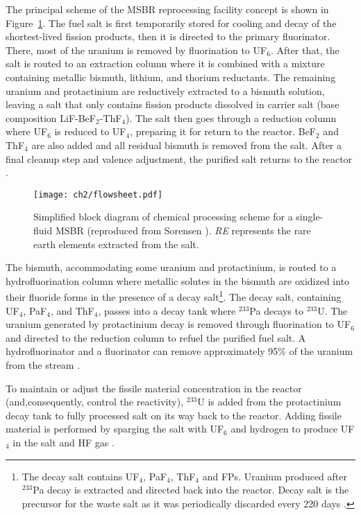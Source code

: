 The principal scheme of the \gls{MSBR} reprocessing facility concept is shown 
in Figure~\ref{fig:material_flow}. The fuel salt is first temporarily stored 
for cooling and decay of the shortest-lived fission products, then it is 
directed to the primary fluorinator. There, most of the uranium is removed by 
fluorination to UF$_6$. After that, the salt is routed to an extraction column 
where it is combined with a mixture containing metallic bismuth, lithium, and 
thorium reductants. The remaining uranium and protactinium are reductively 
extracted to a bismuth solution, leaving a salt that only contains fission 
products dissolved in carrier salt (base composition LiF-BeF$_2$-ThF$_4$). The 
salt then goes through a reduction column where UF$_6$ is reduced to UF$_4$,  
preparing it for return to the reactor. BeF$_2$ and ThF$_4$ are also added and 
all residual bismuth is removed from the salt. After a final cleanup step and  
valence adjustment, the purified salt returns to the reactor 
\cite{carter_design_1972, sorensen_one-fluid_2006}.
\begin{figure}[htp!] %
	\centering
	\texttt{[image: ch2/flowsheet.pdf]}
	\caption{Simplified block diagram of chemical processing scheme for 
	a single-fluid \gls{MSBR} (reproduced from Sorensen 
		\cite{sorensen_one-fluid_2006}). \emph{RE} represents the rare 
		earth elements extracted from the salt.}
	\label{fig:material_flow}
\end{figure}

The bismuth, accommodating some uranium and protactinium, is routed to a 
hydrofluorination column where metallic solutes in the bismuth are oxidized 
into their fluoride forms in the presence of a decay salt\footnote{The decay 
salt contains UF$_4$, PaF$_4$, ThF$_4$ and \glspl{FP}. Uranium produced 
after $^{233}$Pa decay is extracted and directed back into the reactor. Decay 
salt is the precursor for the waste salt as it was periodically discarded  
every 220 days \cite{robertson_conceptual_1971}.}. The decay salt, containing 
UF$_4$, PaF$_4$, and ThF$_4$, passes into a decay tank where $^{233}$Pa 
decays to $^{233}$U. The uranium generated by protactinium decay is removed 
through fluorination to UF$_6$ and directed to the reduction column to refuel 
the purified fuel salt. A  hydrofluorinator and a fluorinator can remove 
approximately 95\% of the uranium from the stream 
\cite{robertson_conceptual_1971}.

To maintain or adjust the fissile material concentration in the reactor 
(and,consequently, control the reactivity), $^{233}$U is added from the 
protactinium decay tank to fully processed salt on its way back to the 
reactor. Adding fissile material is performed by sparging the salt with UF$_6$ 
and hydrogen to produce UF$_4$ in the salt and HF gas 
\cite{robertson_conceptual_1971}.

